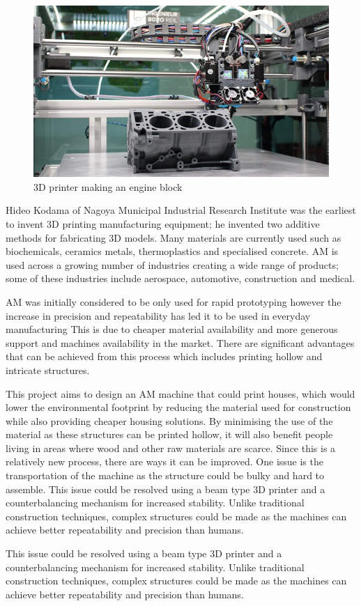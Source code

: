 \documentclass{UoNMCHA}
\numberwithin{equation}{section}
\begin{document}
	\begin{figure}[H]
		\begin{center}
			\includegraphics[width=.75\linewidth]{figs/ali Express}
			\caption{3D printer making an engine block \cite{a2019_3d}}
			\label{figs/ali Express}
		\end{center}
	\end{figure}
	
	Hideo Kodama of Nagoya Municipal Industrial Research Institute was the earliest to invent 3D printing manufacturing equipment; he invented two additive methods for fabricating 3D models. Many materials are currently used such as biochemicals, ceramics metals, thermoplastics and specialised concrete. AM is used across a growing number of industries creating a wide range of products; some of these industries include aerospace, automotive, construction and medical. \par
	AM was initially considered to be only used for rapid prototyping however the increase in precision and repeatability has led it to be used in everyday manufacturing This is due to cheaper material availability and more generous support and machines availability in the market. There are significant advantages that can be achieved from this process which includes printing hollow and intricate structures. \par
	
	This project aims to design an AM machine that could print houses, which would lower the environmental footprint by reducing the material used for construction while also providing cheaper housing solutions. By minimising the use of the material as these structures can be printed hollow, it will also benefit people living in areas where wood and other raw materials are scarce. Since this is a relatively new process, there are ways it can be improved. One issue is the transportation of the machine as the
	structure could be bulky and hard to assemble. This issue could be resolved using a beam type 3D printer and a counterbalancing mechanism for increased stability. Unlike traditional construction techniques, complex structures could be made as the machines can achieve better repeatability and precision than humans.\par
	This issue could be resolved using a beam type 3D printer and a counterbalancing mechanism for increased stability. Unlike traditional construction techniques, complex structures could be made as the machines can achieve better repeatability and precision than humans. \par
	
\end{document}
